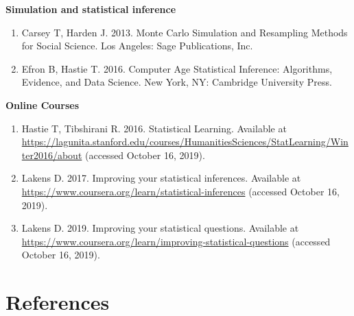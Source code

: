 \documentclass[
]{book}
\begin{document}
\textbf{Simulation and statistical inference}

\begin{enumerate}
\def\labelenumi{\arabic{enumi}.}
\setcounter{enumi}{24}
\item
  Carsey T, Harden J. 2013. Monte Carlo Simulation and Resampling Methods for Social Science. Los Angeles: Sage Publications, Inc.
\item
  Efron B, Hastie T. 2016. Computer Age Statistical Inference: Algorithms, Evidence, and Data Science. New York, NY: Cambridge University Press.
\end{enumerate}

\textbf{Online Courses}

\begin{enumerate}
\def\labelenumi{\arabic{enumi}.}
\setcounter{enumi}{26}
\item
  Hastie T, Tibshirani R. 2016. Statistical Learning. Available at \url{https://lagunita.stanford.edu/courses/HumanitiesSciences/StatLearning/Winter2016/about} (accessed October 16, 2019).
\item
  Lakens D. 2017. Improving your statistical inferences. Available at \url{https://www.coursera.org/learn/statistical-inferences} (accessed October 16, 2019).
\item
  Lakens D. 2019. Improving your statistical questions. Available at \url{https://www.coursera.org/learn/improving-statistical-questions} (accessed October 16, 2019).
\end{enumerate}

\hypertarget{references}{%
\chapter{References}\label{references}}
\end{document}
